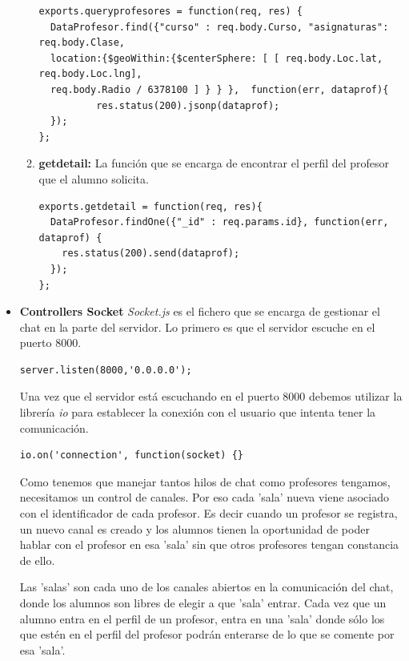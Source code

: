 \begin{itemize}
\begin{enumerate}
\begin{lstlisting}
exports.queryprofesores = function(req, res) {
  DataProfesor.find({"curso" : req.body.Curso, "asignaturas": req.body.Clase,
  location:{$geoWithin:{$centerSphere: [ [ req.body.Loc.lat, req.body.Loc.lng],
  req.body.Radio / 6378100 ] } } },  function(err, dataprof){
	      res.status(200).jsonp(dataprof);
  });
};
\end{lstlisting}

    \item \textbf {getdetail: } La función que se encarga de encontrar el perfil del profesor que el alumno solicita.

\begin{lstlisting}
exports.getdetail = function(req, res){
  DataProfesor.findOne({"_id" : req.params.id}, function(err, dataprof) {
    res.status(200).send(dataprof);
  });
};

\end{lstlisting}


\end{enumerate}
\item \textbf{Controllers Socket} \textit{Socket.js} es el fichero que se encarga de gestionar el chat en la parte del servidor. Lo primero es que el servidor escuche en el puerto 8000.
\begin{lstlisting}
server.listen(8000,'0.0.0.0');
\end{lstlisting}

Una vez que el servidor está escuchando en el puerto 8000 debemos utilizar la librería \textit{io} para establecer la conexión con el usuario que intenta tener la comunicación.

\begin{lstlisting}
io.on('connection', function(socket) {}
\end{lstlisting}

Como tenemos que manejar tantos hilos de chat como profesores tengamos, necesitamos un control de canales. Por eso cada 'sala' nueva viene asociado con el identificador de cada profesor. Es decir cuando un profesor se registra, un nuevo canal es creado y los alumnos tienen la oportunidad de poder hablar con el profesor en esa 'sala' sin que otros profesores tengan constancia de ello.

Las 'salas' son cada uno de los canales abiertos en la comunicación del chat, donde los alumnos son libres de elegir a que 'sala' entrar. Cada vez que un alumno entra en el perfil de un profesor, entra en una 'sala' donde sólo los que estén en el perfil del profesor podrán enterarse de lo que se comente por esa 'sala'.


\end{itemize}
